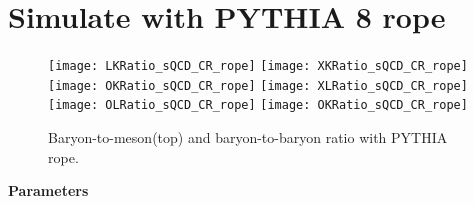 
\section{Simulate with PYTHIA 8 rope}%
\label{sec:rope}
\begin{figure}[ht]
	\begin{center}
		\texttt{[image: LKRatio\_sQCD\_CR\_rope]}
		\texttt{[image: XKRatio\_sQCD\_CR\_rope]}
		\texttt{[image: OKRatio\_sQCD\_CR\_rope]}
		\texttt{[image: XLRatio\_sQCD\_CR\_rope]}
		\texttt{[image: OLRatio\_sQCD\_CR\_rope]}
		\texttt{[image: OKRatio\_sQCD\_CR\_rope]}
	\end{center}
	\caption{Baryon-to-meson(top) and baryon-to-baryon ratio with PYTHIA rope.}
	\label{fig:SMParticle}
\end{figure}

\textbf{Parameters}

